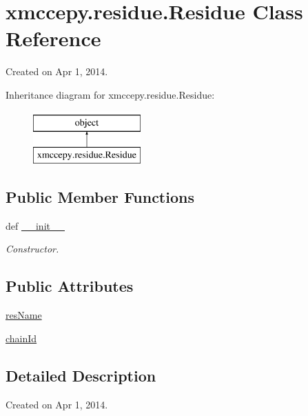 \hypertarget{classxmccepy_1_1residue_1_1_residue}{\section{xmccepy.\-residue.\-Residue Class Reference}
\label{classxmccepy_1_1residue_1_1_residue}
}


Created on Apr 1, 2014.  


Inheritance diagram for xmccepy.\-residue.\-Residue\-:\begin{figure}[H]
\begin{center}
\leavevmode
\includegraphics[height=2.000000cm]{classxmccepy_1_1residue_1_1_residue}
\end{center}
\end{figure}
\subsection*{Public Member Functions}
\begin{DoxyCompactItemize}
\item 
def \hyperlink{classxmccepy_1_1residue_1_1_residue_ab61144d8c5aed99cc706225b17e9ac03}{\-\_\-\-\_\-init\-\_\-\-\_\-}
\begin{DoxyCompactList}\small\item\em Constructor. \end{DoxyCompactList}\end{DoxyCompactItemize}
\subsection*{Public Attributes}
\begin{DoxyCompactItemize}
\item 
\hyperlink{classxmccepy_1_1residue_1_1_residue_a07eb4b463b514b1f1e86d03a6ff02a98}{res\-Name}
\item 
\hyperlink{classxmccepy_1_1residue_1_1_residue_afdd072f15f2fa5640bd67e0e5f6eb1de}{chain\-Id}
\end{DoxyCompactItemize}


\subsection{Detailed Description}
Created on Apr 1, 2014. 

